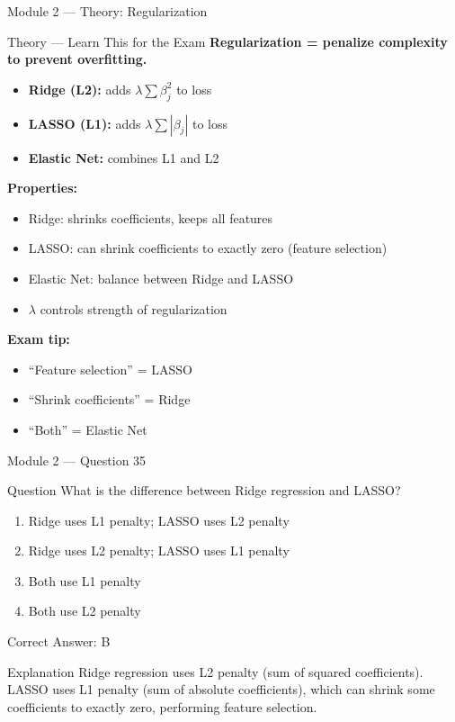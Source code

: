 \documentclass[aspectratio=169,10pt]{beamer}
\newcommand{\question}[1]{%
	\begin{block}{Question}
		#1
	\end{block}
}
\newcommand{\options}[4]{%
	\begin{enumerate}[label=\Alph*.,leftmargin=*]
		\item #1
		\item #2
		\item #3
		\item #4
	\end{enumerate}
}
\newcommand{\answerbox}[1]{%
	\begin{exampleblock}{Correct Answer: #1}
	\end{exampleblock}
}
\newcommand{\explain}[1]{%
	\begin{block}{Explanation}
		\small #1
	\end{block}
}
\newcommand{\theory}[1]{%
	\begin{block}{Theory --- Learn This for the Exam}
		\small #1
	\end{block}
}
\begin{document}
	\begin{frame}{Module 2 --- Theory: Regularization}
		\theory{
			\textbf{Regularization = penalize complexity to prevent overfitting.}
			\begin{itemize}
				\item \textbf{Ridge (L2):} adds $\lambda \sum \beta_j^2$ to loss
				\item \textbf{LASSO (L1):} adds $\lambda \sum |\beta_j|$ to loss
				\item \textbf{Elastic Net:} combines L1 and L2
			\end{itemize}
			\textbf{Properties:}
			\begin{itemize}
				\item Ridge: shrinks coefficients, keeps all features
				\item LASSO: can shrink coefficients to exactly zero (feature selection)
				\item Elastic Net: balance between Ridge and LASSO
				\item $\lambda$ controls strength of regularization
			\end{itemize}
			\textbf{Exam tip:}
			\begin{itemize}
				\item ``Feature selection'' = LASSO
				\item ``Shrink coefficients'' = Ridge
				\item ``Both'' = Elastic Net
			\end{itemize}
		}
	\end{frame}
	
	\begin{frame}{Module 2 --- Question 35}
		\question{What is the difference between Ridge regression and LASSO?}
		\options{Ridge uses L1 penalty; LASSO uses L2 penalty}{Ridge uses L2 penalty; LASSO uses L1 penalty}{Both use L1 penalty}{Both use L2 penalty}
		\answerbox{B}
		\explain{Ridge regression uses L2 penalty (sum of squared coefficients). LASSO uses L1 penalty (sum of absolute coefficients), which can shrink some coefficients to exactly zero, performing feature selection.}
	\end{frame}
	
\end{document}
